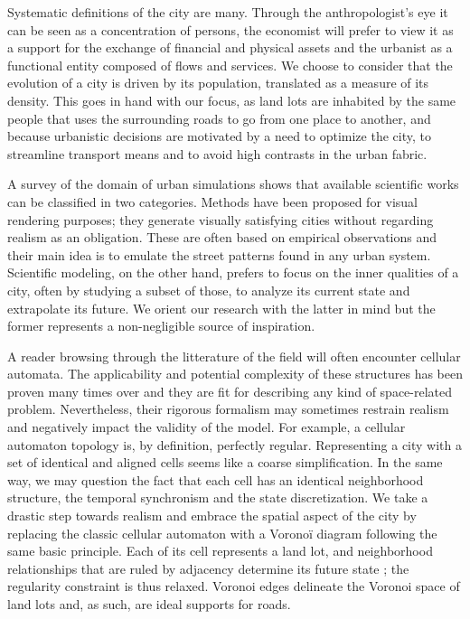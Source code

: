\documentclass[12pt]{article}
\begin{document}
Systematic definitions of the city are many. Through the
anthropologist's eye it can be seen as a concentration of persons, the
economist will prefer to view it as a support for the exchange of
financial and physical assets and the urbanist as a functional entity
composed of flows and services. We choose to consider that the
evolution of a city is driven by its population, translated as a
measure of its density. This goes in hand with our focus, as land lots
are inhabited by the same people that uses the surrounding roads to go
from one place to another, and because urbanistic decisions are
motivated by a need to optimize the city, to streamline transport
means and to avoid high contrasts in the urban fabric.

A survey of the domain of urban simulations shows that available
scientific works can be classified in two categories. Methods have
been proposed for visual rendering purposes; they generate visually
satisfying cities without regarding realism as an obligation. These
are often based on empirical observations and their main idea is to
emulate the street patterns found in any urban system. Scientific
modeling, on the other hand, prefers to focus on the inner qualities
of a city, often by studying a subset of those, to analyze its current
state and extrapolate its future. We orient our research with the
latter in mind but the former represents a non-negligible source of
inspiration.

A reader browsing through the litterature of the field will often
encounter cellular automata. The applicability and potential
complexity of these structures has been proven many times over and
they are fit for describing any kind of space-related
problem. Nevertheless, their rigorous formalism may sometimes restrain
realism and negatively impact the validity of the model. For example,
a cellular automaton topology is, by definition, perfectly
regular. Representing a city with a set of identical and aligned cells
seems like a coarse simplification. In the same way, we may question
the fact that each cell has an identical neighborhood structure, the
temporal synchronism and the state discretization. We take a drastic
step towards realism and embrace the spatial aspect of the city by
replacing the classic cellular automaton with a Voronoï diagram
following the same basic principle. Each of its cell represents a land
lot, and neighborhood relationships that are ruled by adjacency
determine its future state ; the regularity constraint is thus
relaxed. Voronoi edges delineate the Voronoi space of land lots and,
as such, are ideal supports for roads.
\end{document}
